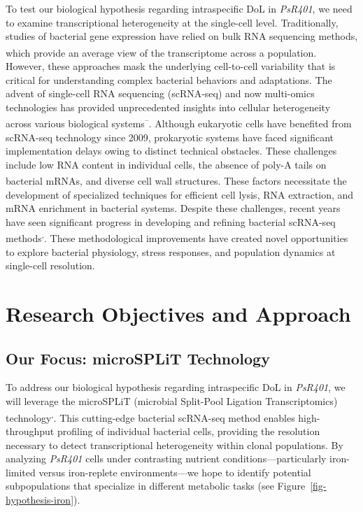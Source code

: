 \documentclass[
  11pt,
  a4paper,
]{report}
\begin{document}
To test our biological hypothesis regarding intraspecific DoL in
\emph{PsR401}, we need to examine transcriptional heterogeneity at the
single-cell level. Traditionally, studies of bacterial gene expression
have relied on bulk RNA sequencing methods, which provide an average
view of the transcriptome across a
population.\textsuperscript{} However,
these approaches mask the underlying cell-to-cell variability that is
critical for understanding complex bacterial behaviors and adaptations.
The advent of single-cell RNA sequencing (scRNA-seq) and now multi-omics
technologies has provided unprecedented insights into cellular
heterogeneity across various biological
systems\textsuperscript{--}.
Although eukaryotic cells have benefited from scRNA-seq technology since
2009, prokaryotic systems have faced significant implementation delays
owing to distinct technical obstacles. These challenges include low RNA
content in individual cells, the absence of poly-A tails on bacterial
mRNAs, and diverse cell wall
structures.\textsuperscript{} These
factors necessitate the development of specialized techniques for
efficient cell lysis, RNA extraction, and mRNA enrichment in bacterial
systems. Despite these challenges, recent years have seen significant
progress in developing and refining bacterial scRNA-seq
methods\textsuperscript{,}.
These methodological improvements have created novel opportunities to
explore bacterial physiology, stress responses, and population dynamics
at single-cell resolution.

\section{Research Objectives and
Approach}\label{research-objectives-and-approach}

\subsection{Our Focus: microSPLiT
Technology}\label{our-focus-microsplit-technology}

To address our biological hypothesis regarding intraspecific DoL in
\emph{PsR401}, we will leverage the microSPLiT (microbial Split-Pool
Ligation Transcriptomics)
technology\textsuperscript{,}.
This cutting-edge bacterial scRNA-seq method enables high-throughput
profiling of individual bacterial cells, providing the resolution
necessary to detect transcriptional heterogeneity within clonal
populations. By analyzing \emph{PsR401} cells under contrasting nutrient
conditions---particularly iron-limited versus iron-replete
environments---we hope to identify potential subpopulations that
specialize in different metabolic tasks (see
Figure~\ref{fig-hypothesis-iron}).
\end{document}
